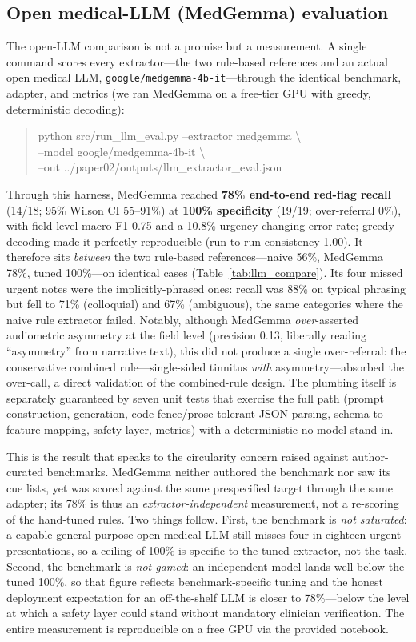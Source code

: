 \documentclass[11pt]{article}
\begin{document}
\subsection{Open medical-LLM (MedGemma) evaluation}
The open-LLM comparison is not a promise but a measurement. A single command scores every extractor---the two rule-based references and an actual open medical LLM, \texttt{google/medgemma-4b-it}---through the identical benchmark, adapter, and metrics (we ran MedGemma on a free-tier GPU with greedy, deterministic decoding):
\begin{quote}\footnotesize\ttfamily
python src/run\_llm\_eval.py --extractor medgemma \textbackslash\\
\phantom{xx}--model google/medgemma-4b-it \textbackslash\\
\phantom{xx}--out ../paper02/outputs/llm\_extractor\_eval.json
\end{quote}

Through this harness, MedGemma reached \textbf{78\% end-to-end red-flag recall} (14/18; 95\% Wilson CI 55--91\%) at \textbf{100\% specificity} (19/19; over-referral 0\%), with field-level macro-F1 0.75 and a 10.8\% urgency-changing error rate; greedy decoding made it perfectly reproducible (run-to-run consistency 1.00). It therefore sits \emph{between} the two rule-based references---naive 56\%, MedGemma 78\%, tuned 100\%---on identical cases (Table~\ref{tab:llm_compare}). Its four missed urgent notes were the implicitly-phrased ones: recall was 88\% on typical phrasing but fell to 71\% (colloquial) and 67\% (ambiguous), the same categories where the naive rule extractor failed. Notably, although MedGemma \emph{over}-asserted audiometric asymmetry at the field level (precision 0.13, liberally reading ``asymmetry'' from narrative text), this did not produce a single over-referral: the conservative combined rule---single-sided tinnitus \emph{with} asymmetry---absorbed the over-call, a direct validation of the combined-rule design. The plumbing itself is separately guaranteed by seven unit tests that exercise the full path (prompt construction, generation, code-fence/prose-tolerant JSON parsing, schema-to-feature mapping, safety layer, metrics) with a deterministic no-model stand-in.

This is the result that speaks to the circularity concern raised against author-curated benchmarks. MedGemma neither authored the benchmark nor saw its cue lists, yet was scored against the same prespecified target through the same adapter; its 78\% is thus an \emph{extractor-independent} measurement, not a re-scoring of the hand-tuned rules. Two things follow. First, the benchmark is \emph{not saturated}: a capable general-purpose open medical LLM still misses four in eighteen urgent presentations, so a ceiling of 100\% is specific to the tuned extractor, not the task. Second, the benchmark is \emph{not gamed}: an independent model lands well below the tuned 100\%, so that figure reflects benchmark-specific tuning and the honest deployment expectation for an off-the-shelf LLM is closer to 78\%---below the level at which a safety layer could stand without mandatory clinician verification. The entire measurement is reproducible on a free GPU via the provided notebook.
\end{document}
